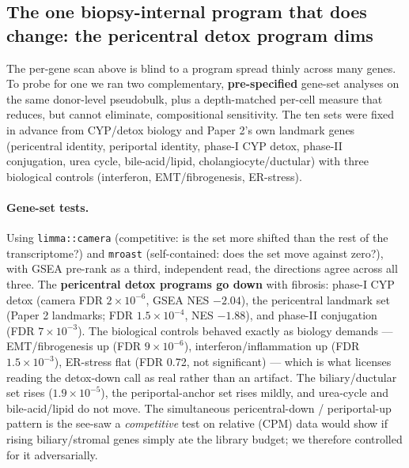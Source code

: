 \documentclass[11pt,a4paper]{article}
\begin{document}
\subsection{The one biopsy-internal program that does change: the pericentral detox program dims}\label{sec:dimming}

The per-gene scan above is blind to a program spread thinly across many genes. To probe for one we ran two complementary, \textbf{pre-specified} gene-set analyses on the same donor-level pseudobulk, plus a depth-matched per-cell measure that reduces, but cannot eliminate, compositional sensitivity. The ten sets were fixed in advance from CYP/detox biology and Paper 2's own landmark genes (pericentral identity, periportal identity, phase-I CYP detox, phase-II conjugation, urea cycle, bile-acid/lipid, cholangiocyte/ductular) with three biological controls (interferon, EMT/fibrogenesis, ER-stress).

\paragraph{Gene-set tests.} Using \texttt{limma::camera} (competitive: is the set more shifted than the rest of the transcriptome?) and \texttt{mroast} (self-contained: does the set move against zero?), with GSEA pre-rank as a third, independent read, the directions agree across all three. The \textbf{pericentral detox programs go down} with fibrosis: phase-I CYP detox (camera FDR $2\times10^{-6}$, GSEA NES $-2.04$), the pericentral landmark set (Paper 2 landmarks; FDR $1.5\times10^{-4}$, NES $-1.88$), and phase-II conjugation (FDR $7\times10^{-3}$). The biological controls behaved exactly as biology demands --- EMT/fibrogenesis up (FDR $9\times10^{-6}$), interferon/inflammation up (FDR $1.5\times10^{-3}$), ER-stress flat (FDR 0.72, not significant) --- which is what licenses reading the detox-down call as real rather than an artifact. The biliary/ductular set rises ($1.9\times10^{-5}$), the periportal-anchor set rises mildly, and urea-cycle and bile-acid/lipid do not move. The simultaneous pericentral-down / periportal-up pattern is the see-saw a \emph{competitive} test on relative (CPM) data would show if rising biliary/stromal genes simply ate the library budget; we therefore controlled for it adversarially.
\end{document}
